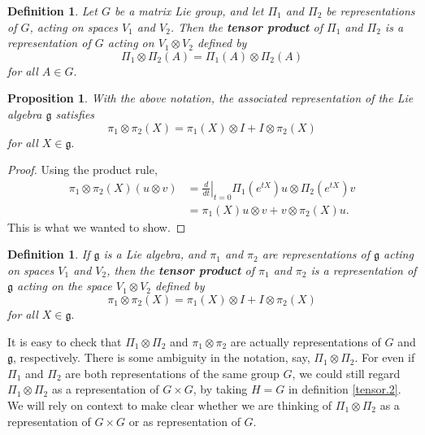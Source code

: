 \documentclass[12pt]{amsbook}
\let \frak = \mathfrak
\theoremstyle{plain}
\newtheorem{definition}[theorem]{Definition}
\newtheorem{proposition}[theorem]{Proposition}
\numberwithin{equation}{chapter}
\numberwithin{theorem}{chapter}
\begin{document}
\begin{definition}
Let $G$ be a matrix Lie group, and let $\Pi_{1}$ and $\Pi_{2}$ be
representations of $G$, acting on spaces $V_{1}$ and $V_{2}$. Then the
\textbf{tensor product} of $\Pi_{1}$ and $\Pi_{2}$ is a representation of $G$
acting on $V_{1}\otimes V_{2}$ defined by
\[
\Pi_{1}\otimes\Pi_{2}(A)=\Pi_{1}(A)\otimes\Pi_{2}(A)
\]
for all $A\in G.$
\end{definition}

\begin{proposition}
With the above notation, the associated representation of the Lie algebra
$\frak{g}$ satisfies
\[
\pi_{1}\otimes\pi_{2}(X)=\pi_{1}(X)\otimes I+I\otimes\pi_{2}(X)
\]
for all $X\in\frak{g}.$
\end{proposition}

\begin{proof}
Using the product rule,
\begin{align*}
\pi_{1}\otimes\pi_{2}(X)\left(  u\otimes v\right)    & =\left.  \frac{d}%
{dt}\right|  _{t=0}\Pi_{1}\left(  e^{tX}\right)  u\otimes\Pi_{2}\left(
e^{tX}\right)  v\\
& =\pi_{1}\left(  X\right)  u\otimes v+v\otimes\pi_{2}\left(  X\right)
u\text{.}%
\end{align*}
This is what we wanted to show.
\end{proof}

\begin{definition}
\label{algebra.tensor}If $\frak{g}$ is a Lie algebra, and $\pi_{1}$ and
$\pi_{2}$ are representations of $\frak{g}$ acting on spaces $V_{1}$ and
$V_{2}$, then the \textbf{tensor product} of $\pi_{1}$ and $\pi_{2}$ is a
representation of $\frak{g}$ acting on the space $V_{1}\otimes V_{2}$ defined
by
\[
\pi_{1}\otimes\pi_{2}(X)=\pi_{1}(X)\otimes I+I\otimes\pi_{2}(X)
\]
for all $X\in\frak{g}.$
\end{definition}

It is easy to check that $\Pi_{1}\otimes\Pi_{2}$ and $\pi_{1}\otimes\pi_{2}$
are actually representations of $G$ and $\frak{g}$, respectively. There is
some ambiguity in the notation, say, $\Pi_{1}\otimes\Pi_{2}$. For even if
$\Pi_{1}$ and $\Pi_{2}$ are both representations of the same group $G$, we
could still regard $\Pi_{1}\otimes\Pi_{2}$ as a representation of $G\times G$,
by taking $H=G$ in definition \ref{tensor.2}. We will rely on context to make
clear whether we are thinking of $\Pi_{1}\otimes\Pi_{2}$ as a representation
of $G\times G$ or as representation of $G$.
\end{document}
